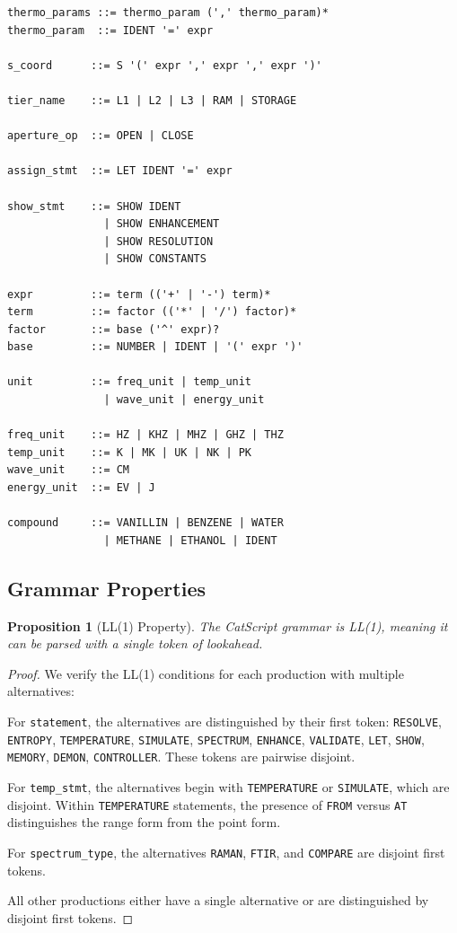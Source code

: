 \documentclass[twocolumn,10pt]{article}
\newtheorem{proposition}[theorem]{Proposition}
\begin{document}
\begin{verbatim}
thermo_params ::= thermo_param (',' thermo_param)*
thermo_param  ::= IDENT '=' expr

s_coord      ::= S '(' expr ',' expr ',' expr ')'

tier_name    ::= L1 | L2 | L3 | RAM | STORAGE

aperture_op  ::= OPEN | CLOSE

assign_stmt  ::= LET IDENT '=' expr

show_stmt    ::= SHOW IDENT
               | SHOW ENHANCEMENT
               | SHOW RESOLUTION
               | SHOW CONSTANTS

expr         ::= term (('+' | '-') term)*
term         ::= factor (('*' | '/') factor)*
factor       ::= base ('^' expr)?
base         ::= NUMBER | IDENT | '(' expr ')'

unit         ::= freq_unit | temp_unit
               | wave_unit | energy_unit

freq_unit    ::= HZ | KHZ | MHZ | GHZ | THZ
temp_unit    ::= K | MK | UK | NK | PK
wave_unit    ::= CM
energy_unit  ::= EV | J

compound     ::= VANILLIN | BENZENE | WATER
               | METHANE | ETHANOL | IDENT
\end{verbatim}

\subsection{Grammar Properties}

\begin{proposition}[LL(1) Property]
The CatScript grammar is LL(1), meaning it can be parsed with a single token of lookahead.
\end{proposition}

\begin{proof}
We verify the LL(1) conditions for each production with multiple alternatives:

For \texttt{statement}, the alternatives are distinguished by their first token: \texttt{RESOLVE}, \texttt{ENTROPY}, \texttt{TEMPERATURE}, \texttt{SIMULATE}, \texttt{SPECTRUM}, \texttt{ENHANCE}, \texttt{VALIDATE}, \texttt{LET}, \texttt{SHOW}, \texttt{MEMORY}, \texttt{DEMON}, \texttt{CONTROLLER}. These tokens are pairwise disjoint.

For \texttt{temp\_stmt}, the alternatives begin with \texttt{TEMPERATURE} or \texttt{SIMULATE}, which are disjoint. Within \texttt{TEMPERATURE} statements, the presence of \texttt{FROM} versus \texttt{AT} distinguishes the range form from the point form.

For \texttt{spectrum\_type}, the alternatives \texttt{RAMAN}, \texttt{FTIR}, and \texttt{COMPARE} are disjoint first tokens.

All other productions either have a single alternative or are distinguished by disjoint first tokens.
\end{proof}
\end{document}
